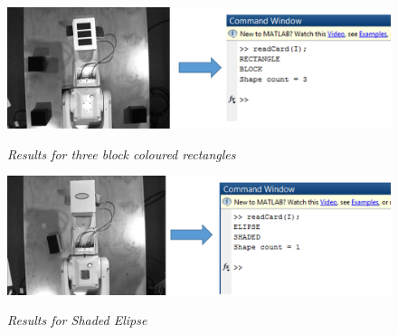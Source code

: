 \begin{figure}[position = here]
	\begin{centering}
		\includegraphics[scale=0.5]{./sachiths_images/image8.png}\\
		\caption[]{\textit{Results for three block coloured rectangles}}
	\end{centering}
\end{figure}

\begin{figure}[position = here]
	\begin{centering}
		\includegraphics[scale=0.5]{./sachiths_images/image10.png}\\
		\caption[]{\textit{Results for Shaded Elipse}}
	\end{centering}
\end{figure}

